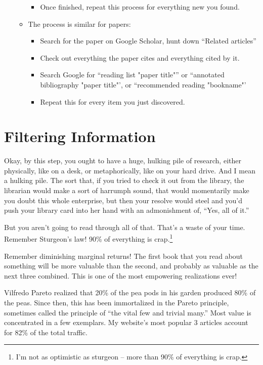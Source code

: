 \begin{enumerate}
\begin{itemize}
\begin{itemize}
    \item Once finished, repeat this process for everything new you found.
    \end{itemize}
  \item The process is similar for papers:
    \begin{itemize}
    \item Search for the paper on Google Scholar, hunt down ``Related articles''
    \item Check out everything the paper cites and everything cited by it.
    \item Search Google for ``reading list "paper title"'' or ``annotated bibliography "paper title"', or ``recommended reading "bookname"'
    \item Repeat this for every item you just discovered.
    \end{itemize}
  \end{itemize}
\end{enumerate}

\section{Filtering Information}

Okay, by this step, you ought to have a huge, hulking pile of research, either
physically, like on a desk, or metaphorically, like on your hard drive. And I
mean a hulking pile. The sort that, if you tried to check it out from the
library, the librarian would make a sort of harrumph sound, that would
momentarily make you doubt this whole enterprise, but then your resolve would
steel and you'd push your library card into her hand with an admonishment of,
``Yes, all of it.''

But you aren't going to read through all of that. That's a waste of
your time. Remember Sturgeon's law! 90\% of everything is
crap.\footnote{I'm not as optimistic as sturgeon -- more than 90\% of
  everything is crap.}

Remember diminishing marginal returns! The first book that you read about something will
be more valuable than the second, and probably as valuable as the next three
combined. This is one of the most empowering realizations ever!

Vilfredo Pareto realized that 20\% of the pea pods in his garden produced 80\% of the peas. Since then, this has been immortalized in the Pareto principle, sometimes called the principle of ``the vital few and trivial many.'' Most value is concentrated in a few exemplars. My website's most popular 3 articles account for 82\% of the total traffic.

